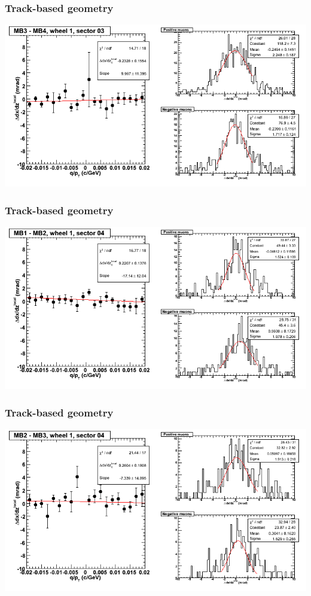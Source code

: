 \documentclass[compress]{beamer}
\begin{document}
\begin{frame}
\frametitle{Track-based geometry}
\includegraphics[width=\linewidth]{NOV4_segdiffs/dt13_slope_D_03_34.png}
\end{frame}

\begin{frame}
\frametitle{Track-based geometry}
\includegraphics[width=\linewidth]{NOV4_segdiffs/dt13_slope_D_04_12.png}
\end{frame}

\begin{frame}
\frametitle{Track-based geometry}
\includegraphics[width=\linewidth]{NOV4_segdiffs/dt13_slope_D_04_23.png}
\end{frame}
\end{document}
